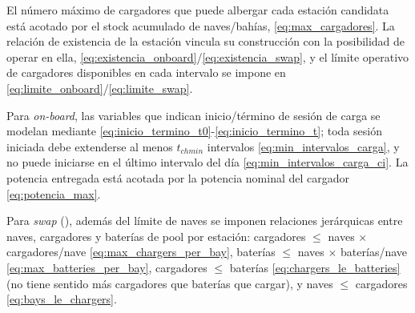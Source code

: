El número máximo de cargadores que puede albergar cada estación candidata está acotado por el stock acumulado de naves/bahías, \eqref{eq:max_cargadores}. La relación de existencia de la estación vincula su construcción con la posibilidad de operar en ella, \eqref{eq:existencia_onboard}/\eqref{eq:existencia_swap}, y el límite operativo de cargadores disponibles en cada intervalo se impone en \eqref{eq:limite_onboard}/\eqref{eq:limite_swap}. 

Para \textit{on-board}, las variables que indican inicio/término de sesión de carga se modelan mediante \eqref{eq:inicio_termino_t0}-\eqref{eq:inicio_termino_t}; toda sesión iniciada debe extenderse al menos $t_{chmin}$ intervalos \eqref{eq:min_intervalos_carga}, y no puede iniciarse en el último intervalo del día \eqref{eq:min_intervalos_carga_ci}. La potencia entregada está acotada por la potencia nominal del cargador \eqref{eq:potencia_max}.

Para \textit{swap} (), además del límite de naves se imponen relaciones jerárquicas entre naves, cargadores y baterías de pool por estación: cargadores $\le$ naves $\times$ cargadores/nave \eqref{eq:max_chargers_per_bay}, baterías $\le$ naves $\times$ baterías/nave \eqref{eq:max_batteries_per_bay}, cargadores $\le$ baterías \eqref{eq:chargers_le_batteries} (no tiene sentido más cargadores que baterías que cargar), y naves $\le$ cargadores \eqref{eq:bays_le_chargers}.

